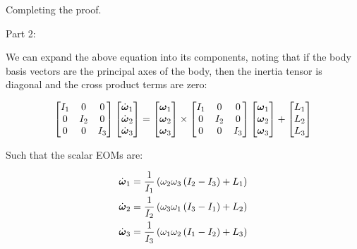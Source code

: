 Completing the proof.

Part 2:

We can expand the above equation into its components, noting that if the body basis vectors are the principal axes of the body, then the inertia tensor is diagonal and the cross product terms are zero:

\begin{equation}
    \begin{bmatrix}
        I_1 & 0 & 0 \\
        0 & I_2 & 0 \\
        0 & 0 & I_3 \\
    \end{bmatrix}
    \begin{bmatrix}
        \dot{\boldsymbol{\omega}}_1 \\
        \dot{\boldsymbol{\omega}}_2 \\
        \dot{\boldsymbol{\omega}}_3 \\
    \end{bmatrix}
    =
    \begin{bmatrix}
        \boldsymbol{\omega}_1 \\
        \boldsymbol{\omega}_2 \\
        \boldsymbol{\omega}_3 \\
    \end{bmatrix}
    \times
    \begin{bmatrix}
        I_1 & 0 & 0 \\
        0 & I_2 & 0 \\
        0 & 0 & I_3 \\
    \end{bmatrix}
    \begin{bmatrix}
        \boldsymbol{\omega}_1 \\
        \boldsymbol{\omega}_2 \\
        \boldsymbol{\omega}_3 \\
    \end{bmatrix}
    +
    \begin{bmatrix}
        L_1 \\
        L_2 \\
        L_3 \\
    \end{bmatrix}
\end{equation}

Such that the scalar EOMs are:

\begin{align*}
    \dot{\boldsymbol{\omega}}_1 &= \frac{1}{I_1} \left(\omega_2 \omega_3 \left(I_2 - I_3\right) + L_1 \right)\\
    \dot{\boldsymbol{\omega}}_2 &= \frac{1}{I_2} \left(\omega_3 \omega_1 \left(I_3 - I_1\right) + L_2 \right)\\
    \dot{\boldsymbol{\omega}}_3 &= \frac{1}{I_3} \left(\omega_1 \omega_2 \left(I_1 - I_2\right) + L_3 \right)\\
\end{align*}

